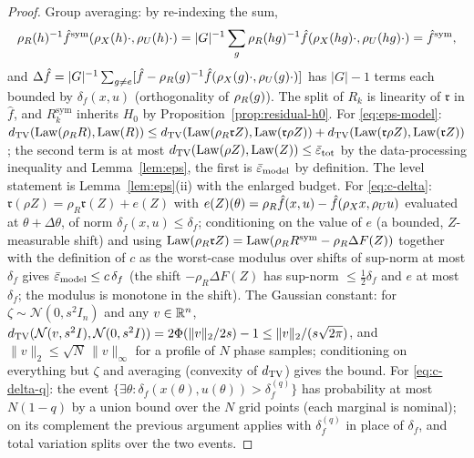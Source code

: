 \begin{proof}
Group averaging: by re-indexing the sum,
\[
  \rho_{R}(h)^{-1}\hat f^{\mathrm{sym}}(\rho_{X}(h)\cdot,\rho_{U}(h)\cdot)
  = |G|^{-1}\sum_g \rho_{R}(hg)^{-1}\hat f(\rho_{X}(hg)\cdot,\rho_{U}(hg)\cdot) = \hat f^{\mathrm{sym}},
\]
and $\Delta\hat f = |G|^{-1}\sum_{g \neq e}[\hat f -
\rho_{R}(g)^{-1}\hat f(\rho_{X}(g)\cdot,\rho_{U}(g)\cdot)]$ has $|G|-1$ terms each
bounded by $\delta_f(x,u)$ (orthogonality of $\rho_{R}(g)$). The split of $R_k$
is linearity of $\mathfrak{r}$ in $\hat f$, and $R^{\mathrm{sym}}_k$
inherits $H_0$ by Proposition~\ref{prop:residual-h0}. For
\eqref{eq:eps-model}: $d_{\mathrm{TV}}(\operatorname{Law}(\rho_R R), \operatorname{Law}(R)) \le d_{\mathrm{TV}}(\operatorname{Law}(\rho_R
\mathfrak{r}Z), \operatorname{Law}(\mathfrak{r}\rho Z)) + d_{\mathrm{TV}}(\operatorname{Law}(\mathfrak{r}\rho Z),
\operatorname{Law}(\mathfrak{r} Z))$; the second term is at most $d_{\mathrm{TV}}(\operatorname{Law}(\rho Z),
\operatorname{Law}(Z)) \le \bar\varepsilon_{\mathrm{tot}}$ by the data-processing inequality and
Lemma~\ref{lem:eps}, the first is $\bar\varepsilon_{\mathrm{model}}$ by definition. The level
statement is Lemma~\ref{lem:eps}(ii) with the enlarged budget. For
\eqref{eq:c-delta}: $\mathfrak{r}(\rho Z) = \rho_R \mathfrak{r}(Z) + e(Z)$
with $e(Z)(\theta) = \rho_{R}\hat f(x,u) - \hat f(\rho_{X} x,\rho_{U} u)$ evaluated at
$\theta + \Delta\theta$, of norm $\delta_f(x,u) \le \delta_f$; conditioning
on the value of $e$ (a bounded, $Z$-measurable shift) and using
$\operatorname{Law}(\rho_R\mathfrak{r} Z) = \operatorname{Law}(\rho_R R^{\mathrm{sym}} - \rho_R\Delta F(Z))$
together with the definition of $c$ as the worst-case modulus over shifts of
sup-norm at most $\delta_f$ gives $\bar\varepsilon_{\mathrm{model}} \le c\,\delta_f$ (the
shift $-\rho_R \Delta F(Z)$ has sup-norm $\le \tfrac12\delta_f$ and $e$ at
most $\delta_f$; the modulus is monotone in the shift). The Gaussian
constant: for $\zeta \sim \mathcal{N}(0,s^2 I_n)$ and any $v \in \mathbb{R}^n$,
$d_{\mathrm{TV}}(\mathcal{N}(v,s^2 I), \mathcal{N}(0,s^2 I)) = 2\Phi(\|v\|_2/2s) - 1 \le
\|v\|_2/(s\sqrt{2\pi})$, and $\|v\|_2 \le \sqrt{N}\,\|v\|_\infty$ for a
profile of $N$ phase samples; conditioning on everything but $\zeta$ and
averaging (convexity of $d_{\mathrm{TV}}$) gives the bound. For \eqref{eq:c-delta-q}:
the event $\{\exists\theta : \delta_f(x(\theta),u(\theta)) > \delta_f^{(q)}\}$
has probability at most $N(1-q)$ by a union bound over the $N$ grid points
(each marginal is nominal); on its complement the previous argument applies
with $\delta_f^{(q)}$ in place of $\delta_f$, and total variation splits over
the two events.
\end{proof}

